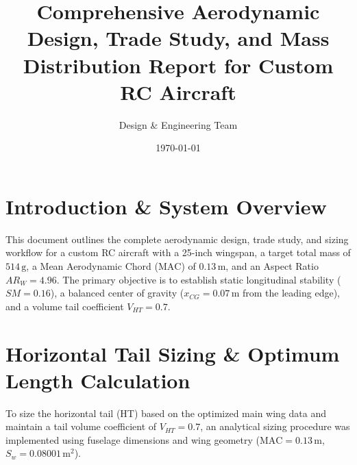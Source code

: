 \documentclass[11pt,a4paper]{article}
\title{\textbf{Comprehensive Aerodynamic Design, Trade Study, and Mass Distribution Report for Custom RC Aircraft}}
\author{Design \& Engineering Team}
\date{\today}
\begin{document}
\maketitle

\section{Introduction \& System Overview}
This document outlines the complete aerodynamic design, trade study, and sizing workflow for a custom RC aircraft with a 25-inch wingspan, a target total mass of $514\,\text{g}$, a Mean Aerodynamic Chord ($\text{MAC}$) of $0.13\,\text{m}$, and an Aspect Ratio $AR_{W} = 4.96$. The primary objective is to establish static longitudinal stability ($SM = 0.16$), a balanced center of gravity ($x_{CG} = 0.07\,\text{m}$ from the leading edge), and a volume tail coefficient $V_{HT} = 0.7$.

\section{Horizontal Tail Sizing \& Optimum Length Calculation}
To size the horizontal tail (HT) based on the optimized main wing data and maintain a tail volume coefficient of $V_{HT} = 0.7$, an analytical sizing procedure was implemented using fuselage dimensions and wing geometry ($\text{MAC} = 0.13\,\text{m}$, $S_w = 0.08001\,\text{m}^2$).
\end{document}
